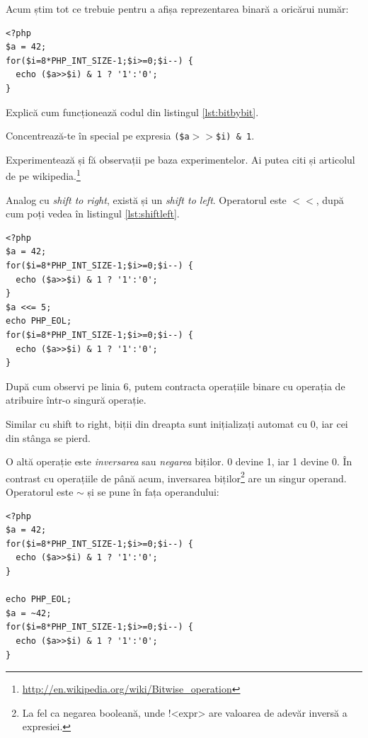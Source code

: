 Acum știm tot ce trebuie pentru a afișa reprezentarea binară a oricărui număr:
\begin{lstlisting}[label=lst:bitbybit,caption={Afișarea bit cu bit a unui int}]
<?php
$a = 42;
for($i=8*PHP_INT_SIZE-1;$i>=0;$i--) {
  echo ($a>>$i) & 1 ? '1':'0';
}
\end{lstlisting}


\begin{Exercise}[difficulty=3,title={Cum funcționează afișarea bit cu bit a unui int?}]
Explică cum funcționează codul din listingul \ref{lst:bitbybit}.

Concentrează-te
în special pe expresia \texttt{(\$a$>>$\$i) \& 1}.

Experimentează și fă observații pe baza experimentelor. Ai putea citi și articolul
de pe wikipedia.\footnote{\url{http://en.wikipedia.org/wiki/Bitwise_operation}}
\end{Exercise}

Analog cu \textit{shift to right}, există și un \textsl{shift to left}. Operatorul este
\texttt{$<<$}, după cum poți vedea \^in listingul \ref{lst:shiftleft}.
\begin{lstlisting}[label=lst:shiftleft,caption={Operatorul shift to left}]
<?php
$a = 42;
for($i=8*PHP_INT_SIZE-1;$i>=0;$i--) {
  echo ($a>>$i) & 1 ? '1':'0';
}
$a <<= 5;
echo PHP_EOL;
for($i=8*PHP_INT_SIZE-1;$i>=0;$i--) {
  echo ($a>>$i) & 1 ? '1':'0';
}
\end{lstlisting}
După cum observi pe linia 6, putem contracta operațiile binare cu operația de atribuire
într-o singură operație.

Similar cu shift to right, biții din dreapta sunt inițializați automat cu 0, iar cei din
stânga se pierd. 

O altă operație este \textsl{inversarea} sau \textsl{negarea} biților. 0 devine 1, iar 1 devine 0.
În contrast cu operațiile de până acum, inversarea biților\footnote{La fel ca negarea
booleană, unde !<expr> are valoarea de adevăr inversă a expresiei.} are un singur operand.
Operatorul este $\sim$ și se pune în fața operandului: 
\begin{lstlisting}
<?php
$a = 42;
for($i=8*PHP_INT_SIZE-1;$i>=0;$i--) {
  echo ($a>>$i) & 1 ? '1':'0';
}

echo PHP_EOL;
$a = ~42;
for($i=8*PHP_INT_SIZE-1;$i>=0;$i--) {
  echo ($a>>$i) & 1 ? '1':'0';
}
\end{lstlisting}

